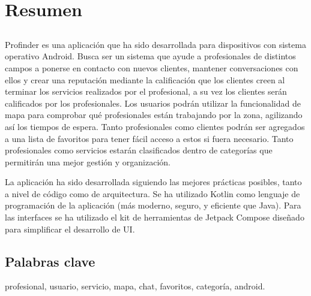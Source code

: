 \chapter*{Resumen}

\section*{\tituloPortadaVal}

Profinder es una aplicación que ha sido desarrollada para dispositivos con sistema operativo Android. Busca ser un sistema que ayude a profesionales de distintos campos a ponerse en contacto con nuevos clientes, mantener conversaciones con ellos y crear una reputación mediante la calificación que los clientes creen al terminar los servicios realizados por el profesional, a su vez los clientes serán calificados por los profesionales. Los usuarios podrán utilizar la funcionalidad de mapa para comprobar qué profesionales están trabajando por la zona, agilizando así los tiempos de espera. Tanto profesionales como clientes podrán ser agregados a una lista de favoritos para tener fácil acceso a estos si fuera necesario. Tanto profesionales como servicios estarán clasificados dentro de categorías que permitirán una mejor gestión y organización.

La aplicación ha sido desarrollada siguiendo las mejores prácticas posibles, tanto a nivel de código como de arquitectura. Se ha utilizado Kotlin como lenguaje de programación de la aplicación (más moderno, seguro, y eficiente que Java). Para las interfaces se ha utilizado el kit de herramientas de Jetpack Compose diseñado para simplificar el desarrollo de UI.

\section*{Palabras clave}
   
\noindent profesional, usuario, servicio, mapa, chat, favoritos, categoría, android.

   



